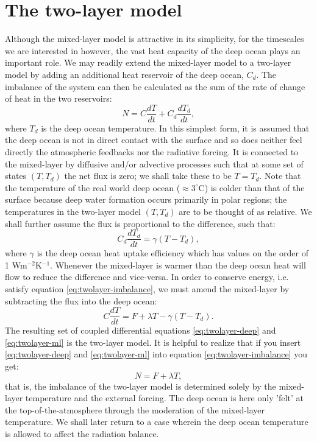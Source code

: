 \documentclass[12pt]{book}
\begin{document}
\section{The two-layer model}
Although the mixed-layer model is attractive in its simplicity, for the timescales we are interested in however, the vast heat capacity of the deep ocean plays an important role. We may readily extend the mixed-layer model to a two-layer model by adding an additional heat reservoir of the deep ocean, $C_d$. The imbalance of the system can then be calculated as the sum of the rate of change of heat in the two reservoirs:
\begin{equation}
N = C\frac{dT}{dt} + C_d\frac{dT_d}{dt}, 
\label{eq:twolayer-imbalance}
\end{equation}
where $T_d$ is the deep ocean temperature. In this simplest form, it is assumed that the deep ocean is not in direct contact with the surface and so does neither feel directly the atmospheric feedbacks nor the radiative forcing. It is connected to the mixed-layer by diffusive and/or advective processes such that at some set of states $(T, T_d)$ the net flux is zero; we shall take these to be $T=T_d$. Note that the temperature of the real world deep ocean ($\approx 3^\circ$C) is colder than that of the surface because deep water formation occurs primarily in polar regions; the temperatures in the two-layer model $(T, T_d)$ are to be thought of as relative. We shall further assume the flux is proportional to the difference, such that:
\begin{equation}
C_d\frac{dT_d}{dt} = \gamma(T-T_d), 
\label{eq:twolayer-deep}
\end{equation}
where $\gamma$ is the deep ocean heat uptake efficiency which has values on the order of 1 Wm$^{-2}$K$^{-1}$. Whenever the mixed-layer is warmer than the deep ocean heat will flow to reduce the difference and vice-versa. In order to conserve energy, i.e. satisfy equation \ref{eq:twolayer-imbalance}, we must amend the mixed-layer by subtracting the flux into the deep ocean:
\begin{equation}
C\frac{dT}{dt} = F + \lambda T - \gamma(T-T_d).
\label{eq:twolayer-ml}
\end{equation}
The resulting set of coupled differential equations \ref{eq:twolayer-deep} and \ref{eq:twolayer-ml} is the two-layer model. It is helpful to realize that if you insert \ref{eq:twolayer-deep} and \ref{eq:twolayer-ml} into equation \ref{eq:twolayer-imbalance} you get:
$$N = F + \lambda T,$$
that is, the imbalance of the two-layer model is determined solely by the mixed-layer temperature and the external forcing. The deep ocean is here only 'felt' at the top-of-the-atmosphere through the moderation of the mixed-layer temperature. We shall later return to a case wherein the deep ocean temperature is allowed to affect the radiation balance.
\end{document}
